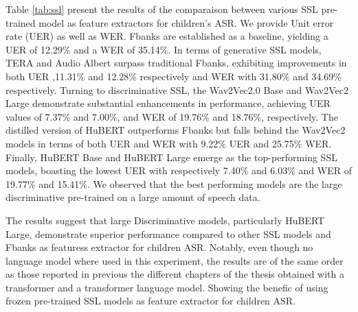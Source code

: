Table \ref{tab:ssl} present the results of the comparaison between various SSL pre-trained model as feature extractors for children's ASR. We provide Unit error rate (UER) as well as WER. Fbanks are established as a baseline, yielding a UER of 12.29\% and a WER of 35.14\%. In terms of generative SSL models, TERA  and Audio Albert surpass traditional Fbanks, exhibiting improvements in both UER ,11.31\% and 12.28\% respectively and WER with 31.80\% and 34.69\% respectively. Turning to discriminative SSL, the Wav2Vec2.0 Base and Wav2Vec2 Large demonstrate substantial enhancements in performance, achieving UER values of 7.37\% and 7.00\%, and WER of 19.76\% and 18.76\%, respectively. The distilled version of HuBERT outperforms Fbanks but falls behind the Wav2Vec2 models in terms of both UER and WER with 9.22\% UER and 25.75\% WER. Finally, HuBERT Base and HuBERT Large emerge as the top-performing SSL models, boasting the lowest UER with respectively 7.40\% and 6.03\% and WER of 19.77\% and 15.41\%. We observed that the best performing models are the large discriminative pre-trained on a large amount of speech data.

The results suggest that large Discriminative models, particularly HuBERT Large, demonstrate superior performance compared to other SSL models and Fbanks as featuress extractor for children ASR. Notably, even though no language model where used in this experiment, the results are of the same order as those reported in previous the different chapters of the thesis obtained with a transformer and a transformer language model. Showing the benefic of using frozen pre-trained SSL models as feature extractor for children ASR.

